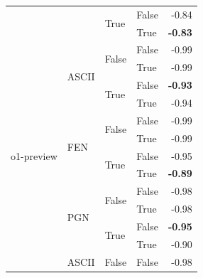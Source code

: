 \documentclass{article}
\begin{document}
\begin{table}
\begin{center}
{\begin{tabular}{@{}llllr@{}}
                                    &                           & \multirow[c]{2}{*}{True}  & False                     & -0.84 \\
                                    &                           &                           & True                      & \textbf{-0.83} \\
    \midrule
    \multirow[c]{13}{*}{o1-preview} & \multirow[c]{4}{*}{ASCII} & \multirow[c]{2}{*}{False} & False                     & -0.99 \\
                                    &                           &                           & True                      & -0.99 \\
                                    &                           & \multirow[c]{2}{*}{True}  & False                     & \textbf{-0.93} \\
                                    &                           &                           & True                      & -0.94 \\
    \cmidrule{2-5}
                                    & \multirow[c]{4}{*}{FEN}   & \multirow[c]{2}{*}{False} & False                     & -0.99 \\
                                    &                           &                           & True                      & -0.99 \\
                                    &                           & \multirow[c]{2}{*}{True}  & False                     & -0.95 \\
                                    &                           &                           & True                      & \textbf{-0.89} \\
    \cmidrule{2-5}
                                    & \multirow[c]{4}{*}{PGN}   & \multirow[c]{2}{*}{False} & False                     & -0.98 \\
                                    &                           &                           & True                      & -0.98 \\
                                    &                           & \multirow[c]{2}{*}{True}  & False                     & \textbf{-0.95} \\
                                    &                           &                           & True                      & -0.90 \\
    \midrule
    \multirow[c]{17}{*}{o1}         & \multirow[c]{4}{*}{ASCII} & \multirow[c]{2}{*}{False} & False                     & -0.98 \\

\end{tabular}}
\end{center}
\end{table}
\end{document}
